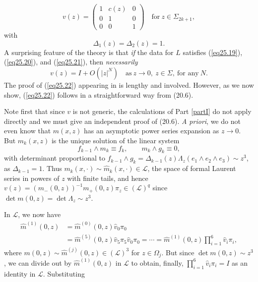\documentclass{surv-l}
\theoremstyle{plain}
\theoremstyle{definition}
\numberwithin{equation}{chapter}
\begin{document}
\begin{equation}\label{eq25.20}
v(z)=\left(\begin{array}{ccc}
1 & c(z) & 0\\
0 & 1 & 0\\
0 & 0 & 1
\end{array}\right)\quad  \mathrm{for}\ z\in\Sigma_{2k+1},
\end{equation}
with
\begin{equation}\label{eq25.21}
\Delta_{1}(z)=\Delta_{2}(z)=1.
\end{equation}
A surprising feature of the theory is that \emph{if} the data for $L$ satisfies (\ref{eq25.19}), (\ref{eq25.20}), and (\ref{eq25.21}), then \emph{necessarily}
\begin{equation}\label{eq25.22}
v(z)=I+O(|z|^{N})\quad \mathrm{as}\ z\rightarrow 0,\ z\in\Sigma,\ \text{for any}\ N.
\end{equation}
The proof of (\ref{eq25.22}) appearing in \cite{DTT} is lengthy and involved. However, as we now show, (\ref{eq25.22}) follows in a straightforward way from (20.6).

Note first that since $v$ is not generic, the calculations of Part \ref{partI} do not apply directly and we must give an independent proof of (20.6). \emph{A priori}, we do not even know that $m(x, z)$ has an asymptotic power series expansion as $z\rightarrow 0$. But $m_{k}(x, z)$ is the unique solution of the linear system
\renewcommand\theequation{7.\arabic{equation}}
\setcounter{equation}{20}
\begin{equation}
f_{k-1}\wedge m_{k}\equiv f_{k},\qquad  m_{k}\wedge g_{k}\equiv 0,
\end{equation}
with determinant proportional to $f_{k-1}\wedge g_{k}=\Delta_{k-1}(z)\Lambda_{z}(e_{1}\wedge e_{2}\wedge e_{3})\sim z^{3}$, as $\Delta_{k-1}=1$. Thus $m_{k}(x, \cdot)\sim\hat{m}_{k}(x, \cdot)\in \mathscr{L}$, the space of formal Laurent series in powers of $z$ with finite tails, and hence $v(z)=(m_{-} (0, z))^{-1}m_{+}(0, z)\pi_{z}\in(\mathscr{L})^{q}$ since $\det m(0,z)=\det\Lambda_{z}\sim z^{3}$.

In $\mathscr{L}$, we now have
\begin{align*}
\hat{m}^{(1)}(0, z)&=\hat{m}^{(0)}(0,z)\hat{v}_{0}\pi_{0}\\
&=\hat{m}^{(5)}(0, z)\hat{v}_{5}\pi_{5}\hat{v}_{0}\pi_{0}=\cdots =\hat{m}^{(1)}(0, z)\prod_{i=1}^{6}\hat{v}_{i}\pi_{i},
\end{align*}
where $m(0, z)\sim\hat{m}^{(j)}(0, z)\in(\mathscr{L})^{3}$ for $z\in\Omega_{j}$. But since $\det m(0, z)\sim z^{3}$, we can divide out by $\hat{m}^{(1)}(0,z)$ in $\mathscr{L}$ to obtain, finally, $\prod_{i=1}^{6}\hat{v}_{i}\pi_{i}=I$ as an identity in $\mathscr{L}$. Substituting
\end{document}
